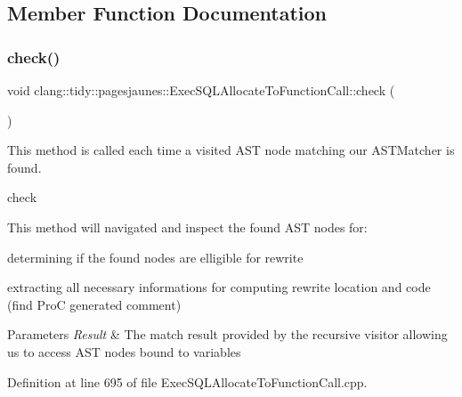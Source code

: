 \subsection{Member Function Documentation}
\mbox{\label{classclang_1_1tidy_1_1pagesjaunes_1_1_exec_s_q_l_allocate_to_function_call_a2c06ff6f41a7d975b218fb97a002db5c}} 
\subsubsection{\texorpdfstring{check()}{check()}}
{\footnotesize\ttfamily void clang\+::tidy\+::pagesjaunes\+::\+Exec\+S\+Q\+L\+Allocate\+To\+Function\+Call\+::check (\begin{DoxyParamCaption}\item[{const ast\+\_\+matchers\+::\+Match\+Finder\+::\+Match\+Result \&}]{ }\end{DoxyParamCaption})\hspace{0.3cm}{\ttfamily [override]}}



This method is called each time a visited A\+ST node matching our A\+S\+T\+Matcher is found. 

check

This method will navigated and inspect the found A\+ST nodes for\+:
\begin{DoxyItemize}
\item determining if the found nodes are elligible for rewrite
\item extracting all necessary informations for computing rewrite location and code (find ProC generated comment)
\end{DoxyItemize}


\begin{DoxyParams}{Parameters}
{\em Result} & The match result provided by the recursive visitor allowing us to access A\+ST nodes bound to variables \\
\hline
\end{DoxyParams}


Definition at line 695 of file Exec\+S\+Q\+L\+Allocate\+To\+Function\+Call.\+cpp.

